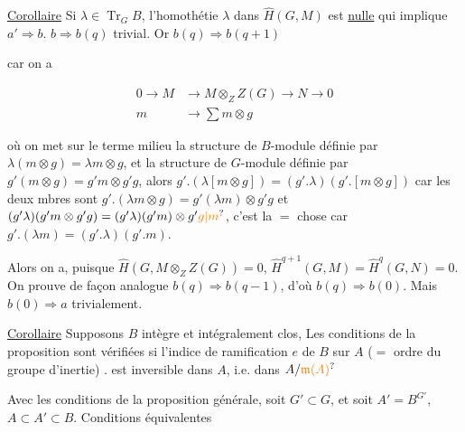 \uline{Corollaire} Si $\lambda\in\operatorname{Tr}_G B$, l'homothétie $\lambda$ dans $\widehat H(G,M)$ est \uline{nulle} \inserted{[et la condition est \unsure{manifeste\textsuperscript{t}|manifestement} nécessaire, en prenant $M=\underline B$)} qui implique $a'\Longrightarrow b$. $b\Longrightarrow b(q)$ trivial. Or $b(q)\Longrightarrow b(q+1)$

car on a

\[
\begin{aligned}
0\to M&\to M\otimes_Z Z(G)\to N\to 0\\[-2pt]
m&\to\textstyle\sum m\otimes g
\end{aligned}
\]

où on met sur le terme milieu la structure de $B$-module définie par $\lambda(m\otimes g)=\lambda m\otimes g$, et la structure de $G$-module définie par $g'(m\otimes g)=g'm\otimes g'g$, alors $g'.(\lambda[m\otimes g])=(g'.\lambda)(g'.[m\otimes g])$ car les deux mbres sont  $g'.(\lambda m\otimes g)=g'(\lambda m)\otimes g'g$ et $(g'\lambda)(g'm\otimes g'g)=(g'\lambda)(g'm)\otimes g'\unsure{g|m}$, c'est la $=$ chose car $g'.(\lambda m)=(g'.\lambda)(g'.m)$.

Alors on a, puisque $\widehat H(G,M\otimes_Z Z(G))=0$, $\widehat H^{q+1}(G,M)=\widehat H^q(G,N)=0$. On prouve de façon analogue $b(q)\Longrightarrow b(q-1)$, d'où $b(q)\Longrightarrow b(0)$. Mais $b(0)\Longrightarrow a$ trivialement.

\uline{Corollaire} Supposons $B$  intègre et intégralement clos,  Les conditions de la proposition sont vérifiées si l'indice de ramification $e$ de $B$ sur $A$ ($={}$ ordre du groupe d'inertie)  . est inversible dans $A$, i.e.  dans $A/\unsure{\mathfrak m(A)}$ 



Avec les conditions de la proposition générale, soit $G'\subset G$, et soit $A'=B^{G'}$, $A\subset A'\subset B$. Conditions équivalentes

